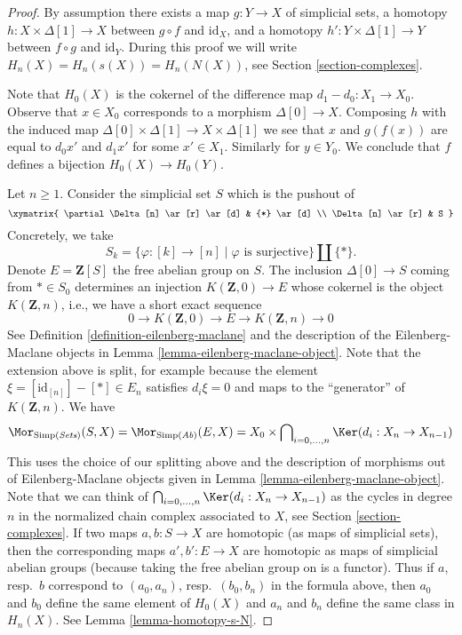 \begin{proof}
By assumption there exists a map $g : Y \to X$ of simplicial sets,
a homotopy $h : X \times \Delta[1] \to X$ between $g \circ f$ and
$\text{id}_X$, and a homotopy $h' : Y \times \Delta[1] \to Y$ between
$f \circ g$ and $\text{id}_Y$. During this proof we will write
$H_n(X) = H_n(s(X)) = H_n(N(X))$, see
Section \ref{section-complexes}.

\medskip\noindent
Note that $H_0(X)$ is the cokernel of the difference map
$d_1 - d_0 : X_1 \to X_0$. Observe that $x \in X_0$ corresponds to
a morphism $\Delta[0] \to X$. Composing $h$ with the induced map
$\Delta[0] \times \Delta[1] \to X \times \Delta[1]$ we see that
$x$ and $g(f(x))$ are equal to $d_0x'$ and $d_1x'$ for some $x' \in X_1$.
Similarly for $y \in Y_0$. We conclude that $f$ defines a bijection
$H_0(X) \to H_0(Y)$.

\medskip\noindent
Let $n \geq 1$. Consider the simplicial set $S$ which is the pushout of
$$
\xymatrix{
\partial \Delta[n] \ar[r] \ar[d] & {*} \ar[d] \\
\Delta[n] \ar[r] & S
}
$$
Concretely, we take
$$
S_k = \{\varphi : [k] \to [n] \mid \varphi\text{ is surjective}\} \amalg \{*\}.
$$
Denote $E = \mathbf{Z}[S]$ the free abelian group on $S$. The inclusion
$\Delta[0] \to S$ coming from $* \in S_0$
determines an injection $K(\mathbf{Z}, 0) \to E$
whose cokernel is the object $K(\mathbf{Z}, n)$, i.e., we have
a short exact sequence
$$
0 \to K(\mathbf{Z}, 0) \to E \to K(\mathbf{Z}, n) \to 0
$$
See Definition \ref{definition-eilenberg-maclane}
and the description of the Eilenberg-Maclane objects in
Lemma \ref{lemma-eilenberg-maclane-object}. Note that the extension
above is split, for example because the element
$\xi = [\text{id}_{[n]}] - [*] \in E_n$ satisfies $d_i\xi = 0$ and
maps to the ``generator'' of $K(\mathbf{Z}, n)$. We have
$$
\Mor_{\text{Simp}(\textit{Sets})}(S, X) =
\Mor_{\text{Simp}(\textit{Ab})}(E, X) =
X_0 \times
\bigcap\nolimits_{i = 0, \ldots, n} \Ker(d_i : X_n \to X_{n - 1})
$$
This uses the choice of our splitting above and the description of morphisms
out of Eilenberg-Maclane objects given in
Lemma \ref{lemma-eilenberg-maclane-object}.
Note that we can think of
$\bigcap\nolimits_{i = 0, \ldots, n} \Ker(d_i : X_n \to X_{n - 1})$
as the cycles in degree $n$ in the normalized chain complex associated
to $X$, see Section \ref{section-complexes}.
If two maps $a, b : S \to X$ are homotopic (as maps
of simplicial sets), then the corresponding maps $a', b' : E \to X$ are
homotopic as maps of simplicial abelian groups (because taking the
free abelian group on is a functor). Thus if $a$, resp.\ $b$ correspond
to $(a_0, a_n)$, resp.\ $(b_0, b_n)$ in the formula above, then
$a_0$ and $b_0$ define the same element of $H_0(X)$ and
$a_n$ and $b_n$ define the same class in $H_n(X)$. See
Lemma \ref{lemma-homotopy-s-N}.


\end{proof}
